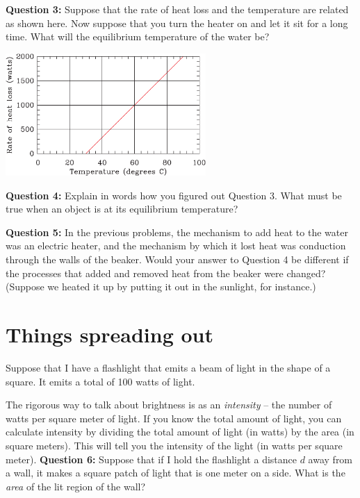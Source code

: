 \documentclass[11pt]{article}
\begin{document}
\vspace{1in}\newpage
{\bf Question 3:} Suppose that the rate of heat loss and the temperature are related as shown here. Now suppose that you
turn the heater on and let it sit for a long time. What will the equilibrium temperature of the water be?

\begin{center}
\includegraphics[width=3in]{heat-loss.pdf}
\end{center}

\vspace{1in}
{\bf Question 4:} Explain in words how you figured out Question 3. What must be true when an object is at its equilibrium
temperature?

\vspace{1in}
{\bf Question 5:} In the previous problems, the mechanism to add heat to the water was an electric heater, and the 
mechanism by which it lost heat was conduction through the walls of the beaker. Would your answer to Question 4 
be different if the processes that added and removed heat from the beaker were changed? (Suppose we heated it up by
putting it out in the sunlight, for instance.)

\vspace{1in}
\section{Things spreading out}

Suppose that I have a flashlight that emits a beam of light in the shape of a square. It emits a total of 
100 watts of light.

The rigorous way to talk about brightness is as an {\it intensity} -- the number of watts per square meter of light.
If you know the total amount of light, you can calculate intensity by dividing the total amount of light (in watts)
by the area (in square meters). This will tell you the intensity of the light (in watts per square meter).
\newpage
{\bf Question 6:} Suppose that if I hold the flashlight a distance $d$ away from a wall, it makes a square patch of light
that is one meter on a side. What is the {\it area} of the lit region of the wall?
\end{document}
